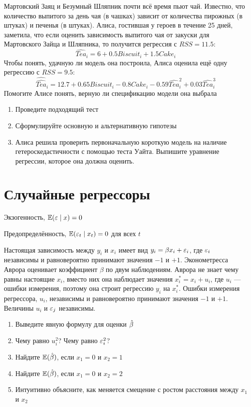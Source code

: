 \documentclass[pdftex,11pt,openany]{book}\usepackage[]{graphicx}\usepackage[]{color}
\begin{document}
\begin{problem}
Мартовский Заяц и Безумный Шляпник почти всё время пьют чай. Известно, что количество выпитого за день чая (в чашках) зависит от количества пирожных (в штуках) и печенья (в штуках).
Алиса, гостившая у героев в течение 25 дней, заметила, что если оценить зависимость выпитого чая от закуски для Мартовского Зайца и Шляпника, то получится регрессия с $RSS=11.5$:
\[
\widehat{Tea}_i=6+0.5Biscuit_i+1.5Cake_i
\] 
Чтобы понять, удачную ли модель она построила,  Алиса оценила ещё одну регрессию с $RSS=9.5$: 
\[
\widehat{\widehat{Tea}}_i=12.7+0.65Biscuit_i-0.8Cake_i-0.59\widehat{Tea}^2_i+0.03\widehat{Tea}^3_i
\]
Помогите Алисе понять, верную ли спецификацию модели она выбрала
\begin{enumerate}
\item Проведите подходящий тест 
\item Сформулируйте основную и альтернативную гипотезы
\item Алиса решила проверить первоначальную короткую модель на наличие гетероскедастичности с помощью теста Уайта. Выпишите уравнение регрессии, которое она должна оценить.
\end{enumerate}
\end{problem}

\begin{solution}
\end{solution}




%


\chapter{Случайные регрессоры}

\begin{problemtext}

Экзогенность, $\mathbb{E}(\varepsilon\mid x)=0$

Предопределённость, $\mathbb{E}(\varepsilon_t\mid x_t)=0$ для всех $t$
\end{problemtext}


\begin{problem}
Настоящая зависимость между $y_i$ и $x_i$ имеет вид $y_i=\beta x_i +\varepsilon_i$, где $\varepsilon_i$ независимы и равновероятно принимают значения $-1$ и $+1$. Эконометресса Аврора оценивает коэффициент $\beta$ по двум наблюдениям. Аврора не знает чему равны настоящие $x_i$, вместо них она наблюдает значения $x^*_i=x_i+u_i$, где $u_i$ --- ошибки измерения, поэтому она строит регрессию $y_i$ на $x_i^*$. Ошибки измерения регрессора, $u_i$, независимы и равновероятно принимают значения $-1$ и $+1$. Величины $u_i$ и $\varepsilon_j$ независимы.
\begin{enumerate}
\item Выведите явную формулу для оценки $\hat{\beta}$
\item Чему равно $u_i^2$? Чему равно $\varepsilon_i^2$?
\item Найдите $\mathbb{E}(\hat{\beta})$, если $x_1=0$ и $x_2=1$
\item Найдите $\mathbb{E}(\hat{\beta})$, если $x_1=0$ и $x_2=2$
\item Интуитивно объясните, как меняется смещение с ростом расстояния между $x_1$ и $x_2$
\end{enumerate}
\end{problem}
\end{document}
